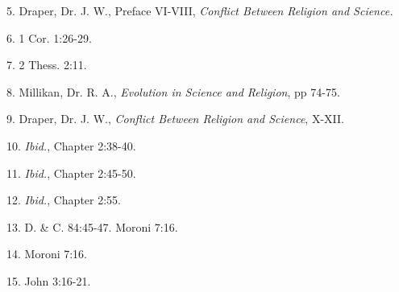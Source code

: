 5. Draper, Dr. J. W., Preface VI-VIII, \textit{Conflict Between Religion and Science.}

6. 1 Cor. 1:26-29.

7. 2 Thess. 2:11.

8. Millikan, Dr. R. A., \textit{Evolution in Science and Religion}, pp 74-75.

9. Draper, Dr. J. W., \textit{Conflict Between Religion and Science}, X-XII.

10. \textit{Ibid.}, Chapter 2:38-40.

11. \textit{Ibid.}, Chapter 2:45-50.

12. \textit{Ibid.}, Chapter 2:55.

13. D. \& C. 84:45-47. Moroni 7:16.

14. Moroni 7:16.

15. John 3:16-21.

